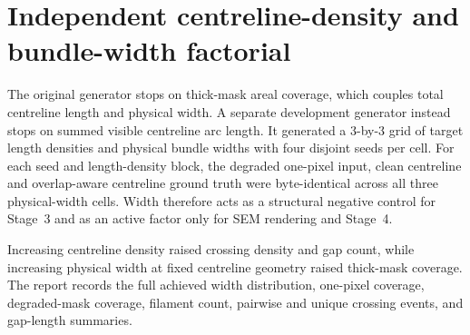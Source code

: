 
\section{Independent centreline-density and bundle-width factorial}
\label{app:factorial}

The original generator stops on thick-mask areal coverage, which couples total
centreline length and physical width. A separate development generator instead
stops on summed visible centreline arc length. It generated a 3-by-3 grid of
target length densities and physical bundle widths with four disjoint seeds per
cell. For each seed and length-density block, the degraded one-pixel input,
clean centreline and overlap-aware centreline ground truth were byte-identical
across all three physical-width cells. Width therefore acts as a structural
negative control for Stage~3 and as an active factor only for SEM rendering and
Stage~4.

\begin{table}[H]
  \centering
  \caption{Achieved properties and Stage-3 grouping outcomes of the 9-cell
  development factorial, with four seeded replicates per cell (36 scenes
  total). Length density is in px per px$^2$; thick-mask coverage is the
  union-area fraction. Each entry is the mean of four seeds. Crossing density,
  gap count and all centreline quantities are invariant across width within a
  geometry block, as are the common-fragment \Fone{}, pairwise precision and
  recall, and object-level recovery, which are therefore pooled over the three
  width levels. Thick-mask coverage is the only reported quantity that responds
  to width.}
  \small
  
\end{table}

Increasing centreline density raised crossing density and gap count, while
increasing physical width at fixed centreline geometry raised thick-mask
coverage. The report records the full achieved width distribution, one-pixel
coverage, degraded-mask coverage, filament count, pairwise and unique crossing
events, and gap-length summaries.

